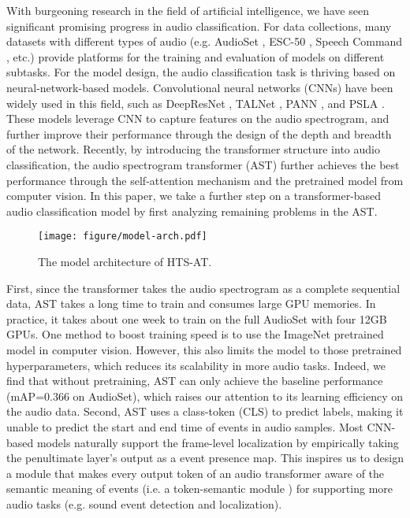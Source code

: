 \documentclass{article}
\begin{document}
With burgeoning research in the field of artificial intelligence, we have seen significant promising progress in audio classification. 
For data collections, many datasets with different types of audio (e.g. AudioSet \cite{audioset}, ESC-50 \cite{esc50}, Speech Command \cite{speechcommandsv2}, etc.) provide platforms for the training and evaluation of models on different subtasks. 
For the model design, the audio classification task is thriving based on neural-network-based models. 
Convolutional neural networks (CNNs) have been widely used in this field, such as DeepResNet \cite{deepres}, TALNet \cite{talnet}, PANN \cite{pann}, and PSLA \cite{psla}. These models leverage CNN to capture features on the audio spectrogram, and further improve their performance through the design of the depth and breadth of the network. 
Recently, by introducing the transformer structure \cite{transformer} into audio classification, the audio spectrogram transformer (AST) \cite{ast} further achieves the best performance through the self-attention mechanism and the pretrained model from computer vision. In this paper, we take a further step on a transformer-based audio classification model by first analyzing remaining problems in the AST.

\begin{figure*}
    \centering
    \texttt{[image: figure/model-arch.pdf]}
    \vspace{-0.6cm}
    \caption{The model architecture of HTS-AT.}
    \label{fig:model-arch}
\vspace{-0.5cm}
\end{figure*}

First, since the transformer takes the audio spectrogram as a complete sequential data, AST takes a long time to train and consumes large GPU memories. In practice, it takes about one week to train on the full AudioSet with four 12GB GPUs. 
One method to boost training speed is to use the ImageNet \cite{imagenet} pretrained model in computer vision. However, this also limits the model to those pretrained hyperparameters, which reduces its scalability in more audio tasks. 
Indeed, we find that without pretraining, AST can only achieve the baseline performance (mAP=0.366 on AudioSet), which raises our attention to its learning efficiency on the audio data.
Second, AST uses a class-token (CLS) to predict labels, making it unable to predict the start and end time of events in audio samples. Most CNN-based models naturally support the frame-level localization by empirically taking the penultimate layer's output as a event presence map. This inspires us to design a module that makes every output token of an audio transformer aware of the semantic meaning of events (i.e. a token-semantic module \cite{tscam}) for supporting more audio tasks (e.g. sound event detection and localization).
\end{document}
